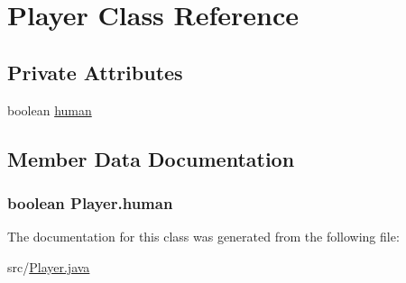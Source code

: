 \hypertarget{classPlayer}{\section{Player Class Reference}
\label{classPlayer}
}
\subsection*{Private Attributes}
\begin{DoxyCompactItemize}
\item 
boolean \hyperlink{classPlayer_af7adf7b362485c88ef5d1e266abff713}{human}
\end{DoxyCompactItemize}


\subsection{Member Data Documentation}
\hypertarget{classPlayer_af7adf7b362485c88ef5d1e266abff713}{
\subsubsection[{human}]{\setlength{\rightskip}{0pt plus 5cm}boolean Player.\-human\hspace{0.3cm}{\ttfamily [private]}}}\label{classPlayer_af7adf7b362485c88ef5d1e266abff713}


The documentation for this class was generated from the following file\-:\begin{DoxyCompactItemize}
\item 
src/\hyperlink{Player_8java}{Player.\-java}\end{DoxyCompactItemize}
